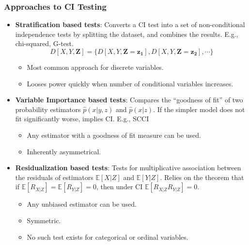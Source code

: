 \documentclass{beamer}
\begin{document}
\begin{frame}
	\frametitle{Approaches to CI Testing}
	\begin{itemize}
		\item \textbf{Stratification based tests}: Converts a CI test
			into a set of non-conditional independence tests by
			splitting the dataset, and combines the results. E.g., chi-squared, G-test.
			\vspace{-0.5em}
			$$ D[X, Y, \bm{Z}] = \{ D[X, Y, \bm{Z}=\bm{z_1}], D[X, Y, \bm{Z}=\bm{z_2}], \cdots \} $$
			\vspace{-1.5em}
			\begin{itemize}
				\item Most common approach for discrete variables.
				\item Looses power quickly when number of conditional variables increases.
			\end{itemize}
		\item \textbf{Variable Importance based tests}: Compares the
			``goodness of fit'' of two probability estimators
			$\hat{p}(x|y, z) $ and $ \hat{p}(x | z) $. If the
			simpler model does not fit significantly worse, implies
			CI. E.g., SCCI
			\begin{itemize}
				\item Any estimator with a goodness of fit
					measure can be used.
				\item Inherently asymmetrical.
			\end{itemize}
		\item \textbf{Residualization based tests}: Tests for
			multiplicative association between the residuals of
			estimators $ \mathbb{E}[X | Z] $ and $ \mathbb{E}[Y|Z]
			$. Relies on the theorem that if $ \mathbb{E}[R_{X|Z}] =
			\mathbb{E}[R_{Y|Z}] = 0 $, then under CI $\mathbb{E}[R_{X|Z}
			R_{Y|Z}] = 0 $.

			\begin{itemize}
				\item Any unbiased estimator can be used.
				\item Symmetric.
				\item No such test exists for categorical or ordinal variables.
			\end{itemize}
	\end{itemize}
\end{frame}
\end{document}
